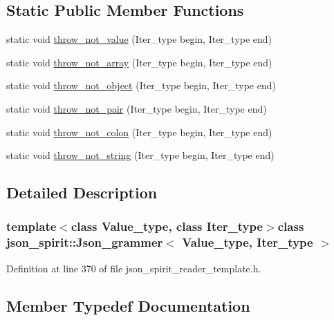 \subsection*{Static Public Member Functions}
\begin{DoxyCompactItemize}
\item 
static void \hyperlink{classjson__spirit_1_1_json__grammer_a1227fb5b6bcd501b6d05d7e9cceee02b}{throw\+\_\+not\+\_\+value} (Iter\+\_\+type begin, Iter\+\_\+type end)
\item 
static void \hyperlink{classjson__spirit_1_1_json__grammer_ac64bb4d2e31662e43ef613ae52bfacfa}{throw\+\_\+not\+\_\+array} (Iter\+\_\+type begin, Iter\+\_\+type end)
\item 
static void \hyperlink{classjson__spirit_1_1_json__grammer_af243428007c7698e3d0a004c56986e30}{throw\+\_\+not\+\_\+object} (Iter\+\_\+type begin, Iter\+\_\+type end)
\item 
static void \hyperlink{classjson__spirit_1_1_json__grammer_ab3c938c81f4bb25ec28c8f2d8fb9deb3}{throw\+\_\+not\+\_\+pair} (Iter\+\_\+type begin, Iter\+\_\+type end)
\item 
static void \hyperlink{classjson__spirit_1_1_json__grammer_aba1fb3ab7a896435c92abf353e120d49}{throw\+\_\+not\+\_\+colon} (Iter\+\_\+type begin, Iter\+\_\+type end)
\item 
static void \hyperlink{classjson__spirit_1_1_json__grammer_a3697b8b95612a64914f7118af86a08c4}{throw\+\_\+not\+\_\+string} (Iter\+\_\+type begin, Iter\+\_\+type end)
\end{DoxyCompactItemize}


\subsection{Detailed Description}
\subsubsection*{template$<$class Value\+\_\+type, class Iter\+\_\+type$>$class json\+\_\+spirit\+::\+Json\+\_\+grammer$<$ Value\+\_\+type, Iter\+\_\+type $>$}



Definition at line 370 of file json\+\_\+spirit\+\_\+reader\+\_\+template.\+h.



\subsection{Member Typedef Documentation}
\hypertarget{classjson__spirit_1_1_json__grammer_af002d620720009cf1d1a8b7bdebcd704}{}

